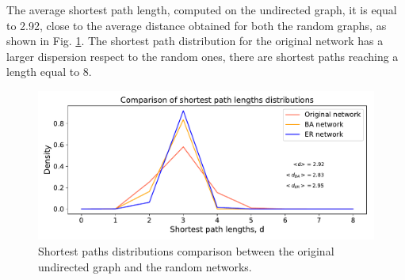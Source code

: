 \documentclass[11pt, twoside]{report}
\begin{document}
The average shortest path length, computed on the undirected graph, it is equal to 2.92, close to the average distance
obtained for both the random graphs, as shown in Fig. \ref{fig:path_comparison}.
The shortest path distribution for the original network has a larger dispersion respect to the random ones, there are shortest paths
reaching a length equal to 8.


    
    \begin{figure}[htbp]
      \centering
      \includegraphics[width=\textwidth]{../../scripts/network_analysis/imgs/paths_hist_comparison.pdf}            
      \caption{Shortest paths distributions comparison between the original undirected graph and the random networks.}
      \label{fig:path_comparison}
    \end{figure}
\end{document}
